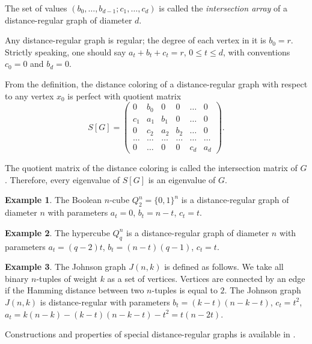 \documentclass[11pt]{article}
\theoremstyle{definition}
\newtheorem{example}{Example}[section]
\begin{document}
The set of values $(b_0,\dots,b_{d-1};c_1,\dots,c_d)$ is called
the {\sl intersection array} of a distance-regular graph of diameter $d$.



Any distance-regular graph is regular; the degree
of each vertex in it is $b_0=r$. Strictly speaking, one should say $a_t +b_t +c_t=r$, $0\leq t\leq d$, with conventions $c_0=0$ and $b_d=0$. 



From the definition, the distance coloring  of a distance-regular graph with respect to any vertex
$x_0$ is perfect with quotient matrix 
 $$S[G]=\begin{pmatrix}
0 & b_0 & 0 & 0& \dots & 0\\
c_1 & a_1 & b_1 & 0 & \dots & 0\\
0 & c_2 & a_2 & b_2 & \dots & 0 \\
\dots & \dots & \dots & \dots & \dots & \dots \\
0 & \dots & 0 & 0 & c_d & a_d
\end{pmatrix}.$$

The quotient matrix of the distance coloring is called the intersection matrix of $G$.
Therefore, every eigenvalue of $S[G]$ is an  eigenvalue of $G$.

\begin{example}\label{ex:hamm_cube_bool_parameters}
The Boolean $n$-cube $Q_2^n=\{0,1\}^n$ is a distance-regular
graph of diameter $n$ with parameters $a_t=0$, $b_t=n-t$, $c_t=t$.
\end{example}

{
\begin{example}
The hypercube $Q_q^n$ is a distance-regular graph of diameter
$n$ with parameters $a_t=(q-2)t$, $b_t=(n-t)(q-1)$, $c_t=t$.
\end{example}
}

{
\begin{example}\label{ex:John}
{The Johnson graph} $J(n,k)$ is defined as follows.  We take all binary $n$-tuples of 
 weight $k$ as a
set of vertices. Vertices are connected by an edge if the Hamming distance between
two $n$-tuples is equal to $2$. The Johnson graph $J(n,k)$ is
distance-regular with parameters 
$b_t=(k-t)(n-k-t)$, $c_t=t^2$, $a_t=k(n-k)-(k-t)(n-k-t)-t^2=t(n-2t)$.
\end{example}
}

Constructions and properties of special
distance-regular graphs is available in \cite{BCN}.
\end{document}

